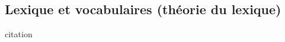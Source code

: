 \documentclass[a4paper,10pt]{article}
\begin{document}
	\subsection{Lexique et vocabulaires (théorie du lexique)}






\begin{center}
	\footnotesize
	\begin{minipage}{0.7\textwidth}
		citation
	\end{minipage}
\end{center}
\medskip




\end{document}
